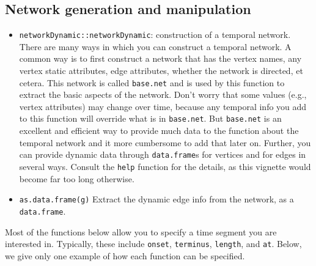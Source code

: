 \documentclass[
]{article}
\providecommand{\tightlist}{%
  \setlength{\itemsep}{0pt}\setlength{\parskip}{0pt}}
\begin{document}
\hypertarget{network-generation-and-manipulation}{%
\subsection{Network generation and
manipulation}\label{network-generation-and-manipulation}}

\begin{itemize}
\tightlist
\item
  \texttt{networkDynamic::networkDynamic}: construction of a temporal
  network. There are many ways in which you can construct a temporal
  network. A common way is to first construct a network that has the
  vertex names, any vertex static attributes, edge attributes, whether
  the network is directed, et cetera. This network is called
  \texttt{base.net} and is used by this function to extract the basic
  aspects of the network. Don't worry that some values (e.g., vertex
  attributes) may change over time, because any temporal info you add to
  this function will override what is in \texttt{base.net}. But
  \texttt{base.net} is an excellent and efficient way to provide much
  data to the function about the temporal network and it more cumbersome
  to add that later on. Further, you can provide dynamic data through
  \texttt{data.frame}s for vertices and for edges in several ways.
  Consult the \texttt{help} function for the details, as this vignette
  would become far too long otherwise.
\item
  \texttt{as.data.frame(g)} Extract the dynamic edge info from the
  network, as a \texttt{data.frame}.
\end{itemize}

Most of the functions below allow you to specify a time segment you are
interested in. Typically, these include \texttt{onset},
\texttt{terminus}, \texttt{length}, and \texttt{at}. Below, we give only
one example of how each function can be specified.
\end{document}
